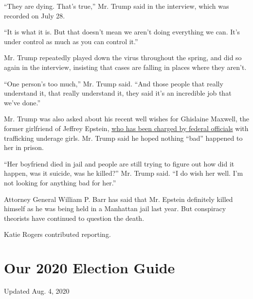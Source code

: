 ``They are dying. That's true,'' Mr. Trump said in the interview, which
was recorded on July 28.

``It is what it is. But that doesn't mean we aren't doing everything we
can. It's under control as much as you can control it.''

Mr. Trump repeatedly played down the virus throughout the spring, and
did so again in the interview, insisting that cases are falling in
places where they aren't.

``One person's too much,'' Mr. Trump said. ``And those people that
really understand it, that really understand it, they said it's an
incredible job that we've done.''

Mr. Trump was also asked about his recent well wishes for Ghislaine
Maxwell, the former girlfriend of Jeffrey Epstein,
\href{https://www.nytimes.com/2020/07/02/nyregion/ghislaine-maxwell-arrest-jeffrey-epstein.html}{who
has been charged by federal officials} with trafficking underage girls.
Mr. Trump said he hoped nothing ``bad'' happened to her in prison.

``Her boyfriend died in jail and people are still trying to figure out
how did it happen, was it suicide, was he killed?'' Mr. Trump said. ``I
do wish her well. I'm not looking for anything bad for her.''

Attorney General William P. Barr has said that Mr. Epstein definitely
killed himself as he was being held in a Manhattan jail last year. But
conspiracy theorists have continued to question the death.

Katie Rogers contributed reporting.

\hypertarget{our-2020-election-guide}{%
\section{Our 2020 Election Guide}\label{our-2020-election-guide}}

Updated Aug. 4, 2020

